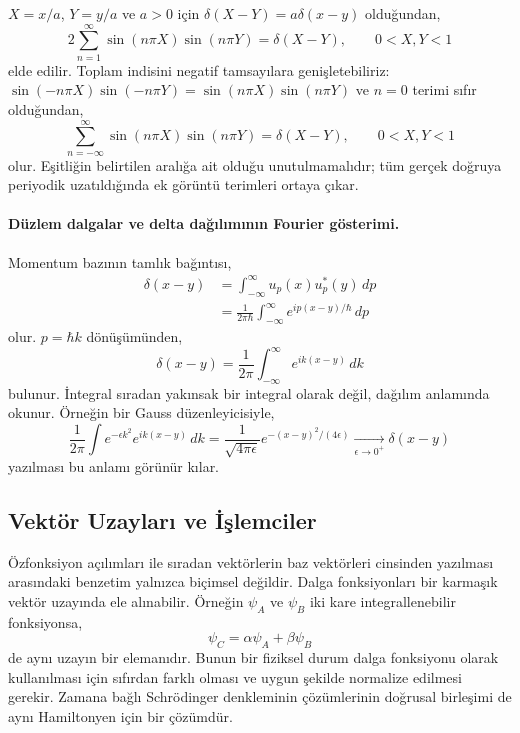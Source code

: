 $X=x/a$, $Y=y/a$ ve $a>0$ için
$\delta(X-Y)=a\delta(x-y)$ olduğundan,
\begin{equation}
 2\sum_{n=1}^{\infty}\sin(n\pi X)\sin(n\pi Y)
 =\delta(X-Y),\qquad 0<X,Y<1
 \label{eq:05_sinus_boyutsuz}
\end{equation}
elde edilir. Toplam indisini negatif tamsayılara genişletebiliriz:
$\sin(-n\pi X)\sin(-n\pi Y)=\sin(n\pi X)\sin(n\pi Y)$ ve $n=0$
terimi sıfır olduğundan,
\begin{equation}
 \sum_{n=-\infty}^{\infty}\sin(n\pi X)\sin(n\pi Y)
 =\delta(X-Y),\qquad 0<X,Y<1
\end{equation}
olur. Eşitliğin belirtilen aralığa ait olduğu unutulmamalıdır;
tüm gerçek doğruya periyodik uzatıldığında ek görüntü terimleri
ortaya çıkar.

\paragraph{Düzlem dalgalar ve delta dağılımının Fourier gösterimi.}
Momentum bazının tamlık bağıntısı,
\begin{align}
 \delta(x-y)&=\int_{-\infty}^{\infty}u_p(x)u_p^*(y)\,dp\\
 &=\frac{1}{2\pi\hbar}\int_{-\infty}^{\infty}
 e^{ip(x-y)/\hbar}\,dp
\end{align}
olur. $p=\hbar k$ dönüşümünden,
\begin{equation}
 \boxed{\delta(x-y)=\frac{1}{2\pi}
       \int_{-\infty}^{\infty}e^{ik(x-y)}\,dk}
 \label{eq:05_delta_fourier}
\end{equation}
bulunur. İntegral sıradan yakınsak bir integral olarak değil,
dağılım anlamında okunur. Örneğin bir Gauss düzenleyicisiyle,
\begin{equation}
 \frac{1}{2\pi}\int e^{-\epsilon k^2}e^{ik(x-y)}\,dk
 =\frac{1}{\sqrt{4\pi\epsilon}}
       e^{-(x-y)^2/(4\epsilon)}
 \xrightarrow[\epsilon\to0^+]{}\delta(x-y)
\end{equation}
yazılması bu anlamı görünür kılar.

\subsection{Vektör Uzayları ve İşlemciler}
\label{sec:05_vektor_uzayi}

Özfonksiyon açılımları ile sıradan vektörlerin baz vektörleri
cinsinden yazılması arasındaki benzetim yalnızca biçimsel değildir.
Dalga fonksiyonları bir karmaşık vektör uzayında ele alınabilir.
Örneğin $\psi_A$ ve $\psi_B$ iki kare integrallenebilir fonksiyonsa,
\begin{equation}
 \psi_C=\alpha\psi_A+\beta\psi_B
\end{equation}
de aynı uzayın bir elemanıdır. Bunun bir fiziksel durum dalga
fonksiyonu olarak kullanılması için sıfırdan farklı olması ve uygun
şekilde normalize edilmesi gerekir. Zamana bağlı Schrödinger
denkleminin çözümlerinin doğrusal birleşimi de aynı Hamiltonyen için
bir çözümdür.

